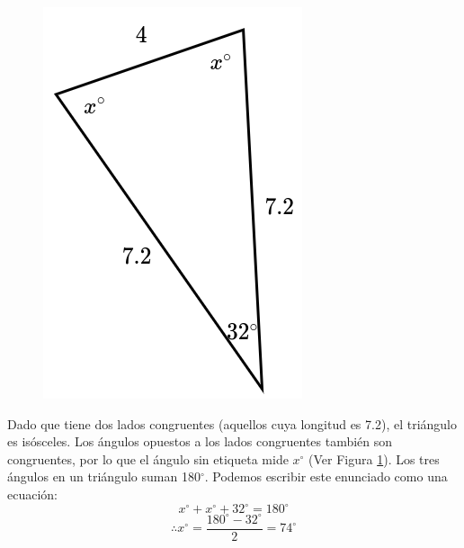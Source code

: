 \begin{minipage}[t][][t]{0.65\textwidth}
    \begin{solutionbox}{7cm}\footnotesize
            \begin{figure}                \centering
                \includegraphics[width=0.85\linewidth]{../images/findangle13a.png}
                \caption{}
                \label{fig:findangle13a}
            \end{figure}
            Dado que tiene dos lados congruentes (aquellos cuya longitud es 7.2), el triángulo es isósceles. Los ángulos opuestos a los lados congruentes también son congruentes, por lo que el ángulo sin etiqueta mide $x^\circ$ (Ver Figura \ref{fig:findangle13a}).
            Los tres ángulos en un triángulo suman 180$^\circ$. Podemos escribir este enunciado como una ecuación:
            \[x^\circ + x^\circ + 32^\circ = 180^\circ \]
            \[\therefore x^\circ = \dfrac{180^\circ - 32^\circ}{2}  = 74^\circ\]
    \end{solutionbox}
\end{minipage}